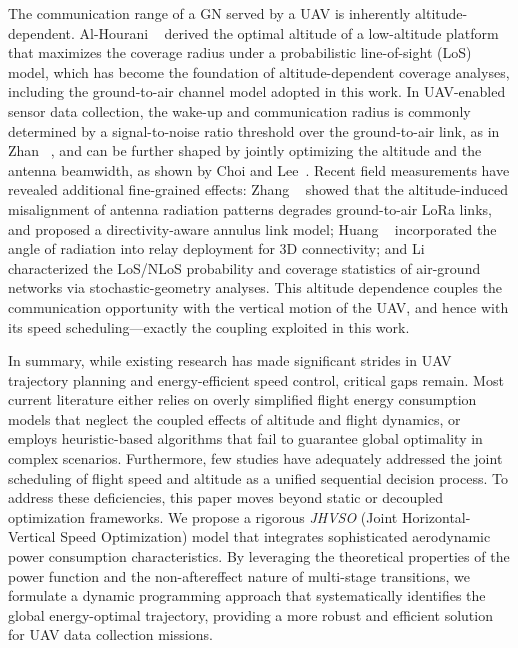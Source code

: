 The communication range of a GN served by a UAV is inherently altitude-dependent.
Al-Hourani \etal~\cite{CommunicationModel} derived the optimal altitude of a low-altitude platform that maximizes the coverage radius under a probabilistic line-of-sight (LoS) model, which has become the foundation of altitude-dependent coverage analyses, including the ground-to-air channel model adopted in this work.
In UAV-enabled sensor data collection, the wake-up and communication radius is commonly determined by a signal-to-noise ratio threshold over the ground-to-air link, as in Zhan \etal~\cite{Energy-efficient-data-collection}, and can be further shaped by jointly optimizing the altitude and the antenna beamwidth, as shown by Choi and Lee~\cite{Altitude-and-beamwidth}.
Recent field measurements have revealed additional fine-grained effects: Zhang \etal~\cite{Directivity-Aware-Link-Model} showed that the altitude-induced misalignment of antenna radiation patterns degrades ground-to-air LoRa links, and proposed a directivity-aware annulus link model; Huang \etal~\cite{AIM} incorporated the angle of radiation into relay deployment for 3D connectivity; and Li \etal~\cite{Poisson-Delaunay} characterized the LoS/NLoS probability and coverage statistics of air-ground networks via stochastic-geometry analyses.
This altitude dependence couples the communication opportunity with the vertical motion of the UAV, and hence with its speed scheduling—exactly the coupling exploited in this work.

In summary, while existing research has made significant strides in UAV trajectory planning and energy-efficient speed control, critical gaps remain.
Most current literature either relies on overly simplified flight energy consumption models that neglect the coupled effects of altitude and flight dynamics, or employs heuristic-based algorithms that fail to guarantee global optimality in complex scenarios.
Furthermore, few studies have adequately addressed the joint scheduling of flight speed and altitude as a unified sequential decision process.
To address these deficiencies, this paper moves beyond static or decoupled optimization frameworks.
We propose a rigorous \textit{JHVSO} (Joint Horizontal-Vertical Speed Optimization) model that integrates sophisticated aerodynamic power consumption characteristics.
By leveraging the theoretical properties of the power function and the non-aftereffect nature of multi-stage transitions, we formulate a dynamic programming approach that systematically identifies the global energy-optimal trajectory, providing a more robust and efficient solution for UAV data collection missions.


